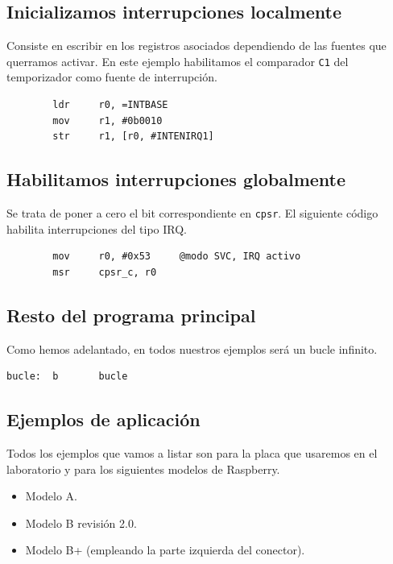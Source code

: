 \subsection{Inicializamos interrupciones localmente}

Consiste en escribir en los registros asociados dependiendo de las fuentes que querramos
activar. En este ejemplo habilitamos el comparador
{\tt C1} del temporizador como fuente de interrupción.

\begin{lstlisting}
        ldr     r0, =INTBASE
        mov     r1, #0b0010
        str     r1, [r0, #INTENIRQ1]
\end{lstlisting}

\subsection{Habilitamos interrupciones globalmente}

Se trata de poner a cero el bit correspondiente en {\tt cpsr}. El siguiente código habilita
interrupciones del tipo IRQ.

\begin{lstlisting}
        mov     r0, #0x53     @modo SVC, IRQ activo
        msr     cpsr_c, r0
\end{lstlisting}

\subsection{Resto del programa principal}

Como hemos adelantado, en todos nuestros ejemplos será un bucle infinito.

\begin{lstlisting}
bucle:  b       bucle
\end{lstlisting}



\subsection{Ejemplos de aplicación}

Todos los ejemplos que vamos a listar son para la placa que usaremos en el laboratorio
y para los siguientes modelos de Raspberry.

\begin{itemize}
  \item Modelo A.
  \item Modelo B revisión 2.0.
  \item Modelo B+ (empleando la parte izquierda del conector).
\end{itemize}

